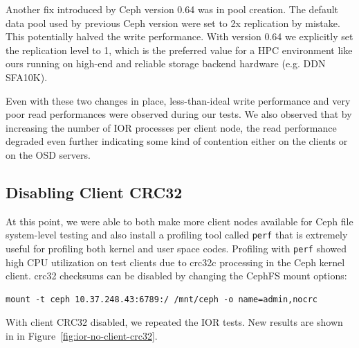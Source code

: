 \documentclass{article}
\begin{document}
Another fix introduced by Ceph version 0.64 was in pool creation.  The default
data pool used by previous Ceph version were set to 2x replication by mistake.
This potentially halved the write performance. With version 0.64 we explicitly
set the replication level to 1, which is the preferred value for a HPC
environment like ours running on high-end and reliable storage backend hardware
(e.g. DDN SFA10K).

Even with these two changes in place, less-than-ideal write performance and
very poor read performances were observed during our tests.  We also observed
that by increasing the number of IOR processes per client node, the read
performance degraded even further indicating some kind of contention either on
the clients or on the OSD servers.


\subsection{Disabling Client CRC32}

At this point, we were able to both make more client nodes available for Ceph
file system-level testing and also install a profiling tool called \verb!perf!
that is extremely useful for profiling both kernel and user space codes.
Profiling with \verb!perf! showed high CPU utilization on test clients due to
crc32c processing in the Ceph kernel client.  crc32 checksums can be disabled
by changing the CephFS mount options:

\begin{Verbatim}
mount -t ceph 10.37.248.43:6789:/ /mnt/ceph -o name=admin,nocrc
\end{Verbatim}


With client CRC32 disabled, we repeated the IOR tests. New results are shown in
in Figure~\ref{fig:ior-no-client-crc32}. 
\end{document}
